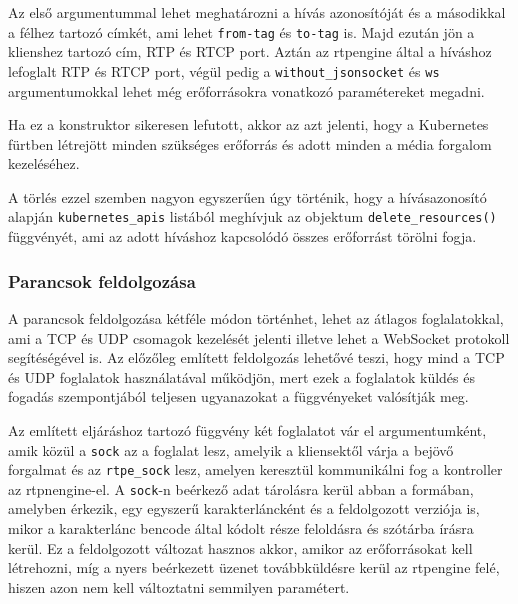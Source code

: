 Az első argumentummal lehet meghatározni a hívás azonosítóját és a másodikkal a félhez
tartozó címkét, ami lehet \texttt{from-tag} és \texttt{to-tag} is. Majd ezután jön a
klienshez tartozó cím, RTP és RTCP port. Aztán az rtpengine által a híváshoz lefoglalt
RTP és RTCP port, végül pedig a \texttt{without\_jsonsocket} és \texttt{ws} 
argumentumokkal lehet még erőforrásokra vonatkozó paramétereket megadni.

Ha ez a konstruktor sikeresen lefutott, akkor az azt jelenti, hogy a Kubernetes 
fürtben létrejött minden szükséges erőforrás és adott minden a média forgalom 
kezeléséhez.

A törlés ezzel szemben nagyon egyszerűen úgy történik, hogy a hívásazonosító alapján
\texttt{kubernetes\_apis} listából meghívjuk az objektum \texttt{delete\_resources()}
függvényét, ami az adott híváshoz kapcsolódó összes erőforrást törölni fogja.

\subsubsection{Parancsok feldolgozása}\label{sec:feldolgozas}

A parancsok feldolgozása kétféle módon történhet, lehet az átlagos foglalatokkal, ami 
a TCP és UDP csomagok kezelését jelenti illetve lehet a WebSocket protokoll segítéségével 
is. Az előzőleg említett feldolgozás lehetővé teszi, hogy mind a TCP és UDP
foglalatok használatával működjön, mert ezek a foglalatok küldés és fogadás szempontjából
teljesen ugyanazokat a függvényeket valósítják meg.

Az említett eljáráshoz tartozó függvény két foglalatot vár el argumentumként, amik közül 
a \texttt{sock} az a foglalat lesz, amelyik a kliensektől várja a bejövő forgalmat és az 
\texttt{rtpe\_sock} lesz, amelyen keresztül kommunikálni fog a kontroller az 
rtpnengine-el. A \texttt{sock}-n beérkező adat tárolásra kerül abban a formában, 
amelyben érkezik, egy egyszerű karakterláncként és a feldolgozott verziója is, mikor a karakterlánc bencode által kódolt része feloldásra és szótárba írásra kerül. Ez a 
feldolgozott változat hasznos akkor, amikor az erőforrásokat kell létrehozni, míg a nyers 
beérkezett üzenet továbbküldésre kerül az rtpengine felé, hiszen azon nem kell 
változtatni semmilyen paramétert.

